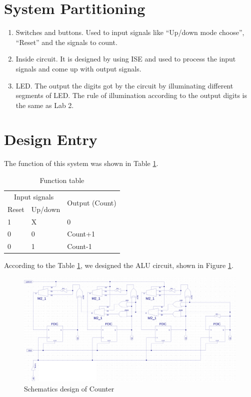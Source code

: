 \documentclass{article}
\begin{document}
\section{System Partitioning}
\begin{enumerate}
\item Switches and buttons. Used to input signals like “Up/down mode choose”, “Reset” and the signals to count.
\item Inside circuit. It is designed by using ISE and used to process the input signals and come up with output signals.
\item LED. The output the digits got by the circuit by illuminating different segments of LED. The rule of illumination according to the output digits is the same as Lab 2.
\end{enumerate}

\section{Design Entry}
The function of this system was shown in Table \ref{function-table}.

\begin{table}[!hbtp]
\centering
\begin{tabular}{|p{2cm}<{\centering}|p{2cm}<{\centering}|p{4cm}<{\centering}|}
\hline
\multicolumn{2}{|c|}{Input signals} & \multirow{2}{*}{Output (Count)}  \\\cline{1-2}
Reset & Up/down & \\\hline
1 & X & 0 \\\hline
0 & 0 & Count+1 \\\hline
0 & 1 & Count-1 \\\hline
\end{tabular}
\caption{Function table}
\label{function-table}
\end{table}

According to the Table \ref{function-table}, we designed the ALU circuit, shown in Figure \ref{design-counter}. \\

\begin{figure}[!htbp]
\centering
\includegraphics[width=0.95\linewidth]{counter.png}
\caption{Schematics design of Counter}
\label{design-counter}
\end{figure}
\end{document}
